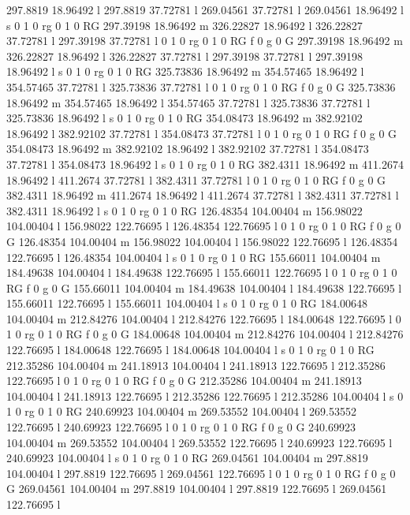 297.8819 18.96492 l 
297.8819 37.72781 l 
269.04561 37.72781 l 
269.04561 18.96492 l 
s 
0 1 0 rg 0 1 0 RG 
297.39198 18.96492 m 
326.22827 18.96492 l 
326.22827 37.72781 l 
297.39198 37.72781 l 
0 1 0 rg 0 1 0 RG f 
0 g 0 G 
297.39198 18.96492 m 
326.22827 18.96492 l 
326.22827 37.72781 l 
297.39198 37.72781 l 
297.39198 18.96492 l 
s 
0 1 0 rg 0 1 0 RG 
325.73836 18.96492 m 
354.57465 18.96492 l 
354.57465 37.72781 l 
325.73836 37.72781 l 
0 1 0 rg 0 1 0 RG f 
0 g 0 G 
325.73836 18.96492 m 
354.57465 18.96492 l 
354.57465 37.72781 l 
325.73836 37.72781 l 
325.73836 18.96492 l 
s 
0 1 0 rg 0 1 0 RG 
354.08473 18.96492 m 
382.92102 18.96492 l 
382.92102 37.72781 l 
354.08473 37.72781 l 
0 1 0 rg 0 1 0 RG f 
0 g 0 G 
354.08473 18.96492 m 
382.92102 18.96492 l 
382.92102 37.72781 l 
354.08473 37.72781 l 
354.08473 18.96492 l 
s 
0 1 0 rg 0 1 0 RG 
382.4311 18.96492 m 
411.2674 18.96492 l 
411.2674 37.72781 l 
382.4311 37.72781 l 
0 1 0 rg 0 1 0 RG f 
0 g 0 G 
382.4311 18.96492 m 
411.2674 18.96492 l 
411.2674 37.72781 l 
382.4311 37.72781 l 
382.4311 18.96492 l 
s 
0 1 0 rg 0 1 0 RG 
126.48354 104.00404 m 
156.98022 104.00404 l 
156.98022 122.76695 l 
126.48354 122.76695 l 
0 1 0 rg 0 1 0 RG f 
0 g 0 G 
126.48354 104.00404 m 
156.98022 104.00404 l 
156.98022 122.76695 l 
126.48354 122.76695 l 
126.48354 104.00404 l 
s 
0 1 0 rg 0 1 0 RG 
155.66011 104.00404 m 
184.49638 104.00404 l 
184.49638 122.76695 l 
155.66011 122.76695 l 
0 1 0 rg 0 1 0 RG f 
0 g 0 G 
155.66011 104.00404 m 
184.49638 104.00404 l 
184.49638 122.76695 l 
155.66011 122.76695 l 
155.66011 104.00404 l 
s 
0 1 0 rg 0 1 0 RG 
184.00648 104.00404 m 
212.84276 104.00404 l 
212.84276 122.76695 l 
184.00648 122.76695 l 
0 1 0 rg 0 1 0 RG f 
0 g 0 G 
184.00648 104.00404 m 
212.84276 104.00404 l 
212.84276 122.76695 l 
184.00648 122.76695 l 
184.00648 104.00404 l 
s 
0 1 0 rg 0 1 0 RG 
212.35286 104.00404 m 
241.18913 104.00404 l 
241.18913 122.76695 l 
212.35286 122.76695 l 
0 1 0 rg 0 1 0 RG f 
0 g 0 G 
212.35286 104.00404 m 
241.18913 104.00404 l 
241.18913 122.76695 l 
212.35286 122.76695 l 
212.35286 104.00404 l 
s 
0 1 0 rg 0 1 0 RG 
240.69923 104.00404 m 
269.53552 104.00404 l 
269.53552 122.76695 l 
240.69923 122.76695 l 
0 1 0 rg 0 1 0 RG f 
0 g 0 G 
240.69923 104.00404 m 
269.53552 104.00404 l 
269.53552 122.76695 l 
240.69923 122.76695 l 
240.69923 104.00404 l 
s 
0 1 0 rg 0 1 0 RG 
269.04561 104.00404 m 
297.8819 104.00404 l 
297.8819 122.76695 l 
269.04561 122.76695 l 
0 1 0 rg 0 1 0 RG f 
0 g 0 G 
269.04561 104.00404 m 
297.8819 104.00404 l 
297.8819 122.76695 l 
269.04561 122.76695 l 
